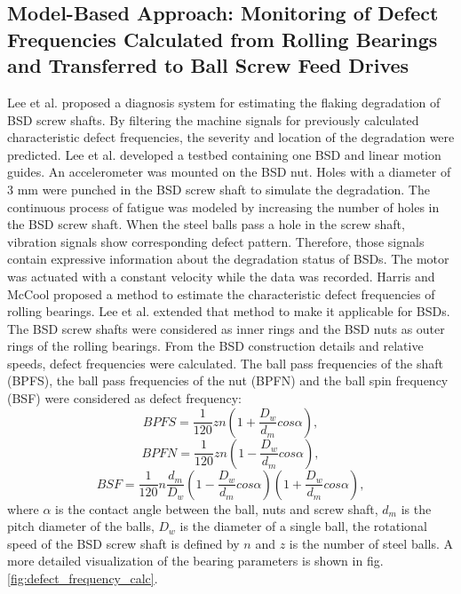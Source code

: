 \subsection{Model-Based Approach: Monitoring of Defect Frequencies Calculated from Rolling Bearings and Transferred to Ball Screw Feed Drives}
Lee et al. \cite{Lee2015} proposed a diagnosis system for estimating the flaking degradation of BSD screw shafts. By filtering the machine signals for previously calculated characteristic defect frequencies, the severity and location of the degradation were predicted. Lee et al. developed a testbed containing one BSD and linear motion guides. An accelerometer was mounted on the BSD nut. Holes with a diameter of 3 mm were punched in the BSD screw shaft to simulate the degradation. The continuous process of fatigue was modeled by increasing the number of holes in the BSD screw shaft. When the steel balls pass a hole in the screw shaft, vibration signals show corresponding defect pattern. Therefore, those signals contain expressive information about the degradation status of BSDs. The motor was actuated with a constant velocity while the data was recorded. Harris and McCool \cite{Harris1996} proposed a method to estimate the characteristic defect frequencies of rolling bearings. Lee et al. \cite{Lee2015} extended that method to make it applicable for BSDs. The BSD screw shafts were considered as inner rings and the BSD nuts as outer rings of the rolling bearings. From the BSD construction details and relative speeds, defect frequencies were calculated. The ball pass frequencies of the shaft (BPFS), the ball pass frequencies of the nut (BPFN) and the ball spin frequency (BSF) were considered as defect frequency: 
\begin{equation}
    BPFS = \frac{1}{120}zn(1+\frac{D_{w}}{d_{m}}cos\alpha),
    \label{eq:defect_frequency}
\end{equation}
\begin{equation}
    BPFN = \frac{1}{120}zn(1-\frac{D_{w}}{d_{m}}cos\alpha),
\end{equation}
\begin{equation}
    BSF = \frac{1}{120}n\frac{d_{m}}{D_{w}} (1-\frac{D_{w}}{d_{m}}cos\alpha)(1+\frac{D_{w}}{d_{m}}cos\alpha) ,
\end{equation}
where $\alpha$ is the contact angle between the ball, nuts and screw shaft, $d_{m}$ is the pitch diameter of the balls, $D_{w}$ is the diameter of a single ball, the rotational speed of the BSD screw shaft is defined by $n$ and $z$ is the number of steel balls. A more detailed visualization of the bearing parameters is shown in fig. \ref{fig:defect_frequency_calc}. 

